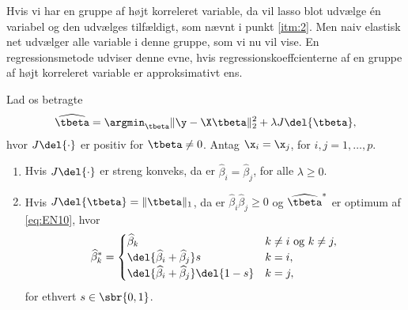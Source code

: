 %
Hvis vi har en gruppe af højt korreleret variable, da vil lasso blot udvælge én variabel og den udvælges tilfældigt, som nævnt i punkt \ref{itm:2}.
Men naiv elastisk net udvælger alle variable i denne gruppe, som vi nu vil vise. 
En regressionsmetode udviser denne evne, hvis regressionskoeffcienterne af en gruppe af højt korreleret variable er approksimativt ens.
%
\begin{lem} \label{lem:elastisk_net2}
Lad os betragte
\begin{align}
\widehat{\tbeta} = \argmin_{\tbeta} \Vert \y - \X \tbeta \Vert_2^2 + \lambda J \del{\tbeta}, \label{eq:EN10}
\end{align}
hvor \(J \del{\cdot}\) er positiv for \(\tbeta \neq 0\).
Antag \(\x_i = \x_j\), for \(i, j = 1, \ldots, p\).
\begin{enumerate}[label=\alph*)]
\item Hvis \(J \del{\cdot}\) er streng konveks, da er \(\widehat{\beta}_i = \widehat{\beta}_j\), for alle \(\lambda \geq 0\).
\item Hvis \(J \del{\tbeta} = \Vert \tbeta \Vert_1\), da er \(\widehat{\beta}_i \widehat{\beta}_j \geq 0\) og \(\widehat{\tbeta}^*\) er optimum af \eqref{eq:EN10}, hvor
\begin{align*}
\widehat{\beta}_k^* = \begin{cases}
\widehat{\beta}_k & k \neq i \text{ og } k \neq j, \\
\del{\widehat{\beta}_i + \widehat{\beta}_j} s & k = i, \\
\del{\widehat{\beta}_i + \widehat{\beta}_j} \del{1-s} & k = j,
\end{cases}
\end{align*}
for ethvert \(s \in \sbr{0,1}\).
\end{enumerate}
\end{lem}
%
